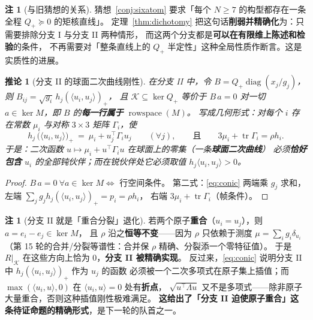 \documentclass[UTF8,11pt]{ctexart}
\newtheorem{corollary}[theorem]{推论}
\theoremstyle{definition}
\newtheorem{remark}[theorem]{注}
\newcommand{\Lam}{\Lambda}
\newcommand{\tr}{\operatorname{tr}}
\begin{document}
\begin{remark}[与旧猜想的关系]\label{rmk:dichvsold}
猜想~\ref{conj:sixatom} 要求「每个 $N\ge7$ 的构型都存在一条全程 $Q_+\succeq0$ 的矩核直线」。
定理~\ref{thm:dichotomy} 把这句话\textbf{削弱并精确化}为：只需要排除分支 I 与分支 II 两种情形，
而这两个分支都是\textbf{可以在有限维上陈述和检验}的条件，
不再需要对「整条直线上的 $Q_+$ 半定性」这种全局性质作断言。这是实质性的进展。
\end{remark}

\begin{corollary}[分支 II 的球面二次曲线刚性]\label{cor:branch2rigid}
在分支 II 中，令 $B=Q_+\operatorname{diag}(x_j/g_j)$，则 $B_{ij}=\sqrt{g_i}\,h_j(\langle u_i,u_j\rangle)_+$，
且 $\mathcal K\subseteq\ker Q_+$ 等价于 $B\,a=0$ 对一切 $a\in\ker M$，即 $B$ 的\textbf{每一行属于} $\operatorname{rowspace}(M)$。
写成几何形式：对每个 $i$ 存在常数 $\mu_i$ 与对称 $3\times3$ 矩阵 $\Gamma_i$，使
\begin{equation}\label{eq:conic}
h_j\,\bigl(\langle u_i,u_j\rangle\bigr)_+\ =\ \mu_i+u_j^\top\Gamma_iu_j\qquad(\forall j),
\qquad\text{且}\qquad 3\mu_i+\tr\Gamma_i=\rho h_i .
\end{equation}
于是：二次函数 $u\mapsto\mu_i+u^\top\Gamma_iu$ 在球面上的零集（一条\textbf{球面二次曲线}）
必须\textbf{恰好包含} $u_i$ 的全部钝伙伴；而在锐伙伴处它必须取值 $h_j\langle u_i,u_j\rangle>0$。
\end{corollary}

\begin{proof}
$B\,a=0\ \forall a\in\ker M\Leftrightarrow$ 行空间条件。
第二式：\eqref{eq:conic} 两端乘 $g_j$ 求和，左端 $\sum_jg_jh_j(\langle u_i,u_j\rangle)_+=p_i=\rho h_i$，
右端 $3\mu_i+\tr\Gamma_i$（帧条件）。
\end{proof}

\begin{remark}[分支 II 就是「重合分裂」退化]\label{rmk:coincident}
若两个原子\textbf{重合}（$u_i=u_j$），则 $a=e_i-e_j\in\ker M$，
且 $\rho$ 沿之\textbf{恒等不变}——因为 $\rho$ 只依赖于测度 $\mu=\sum_ig_i\delta_{u_i}$
（第 15 轮的合并/分裂等谱性：合并保 $\rho$ 精确、分裂添一个零特征值）。
于是 $R|_{\mathcal K}$ 在这些方向上恰为 $0$，\textbf{分支 II 被精确实现}。
反过来，\eqref{eq:conic} 说明分支 II 中 $h_j(\langle u_i,u_j\rangle)_+$ 作为 $u_j$ 的函数
必须被一个二次多项式在原子集上插值；而 $\max(\langle u_i,u\rangle,0)$ 在 $\langle u_i,u\rangle=0$ 处有\textbf{折点}，
$\sqrt{u^\top\Lam u}$ 又不是多项式——除非原子大量重合，否则这种插值刚性极难满足。
\textbf{这给出了「分支 II 迫使原子重合」这条待证命题的精确形式}，是下一轮的队首之一。
\end{remark}
\end{document}
